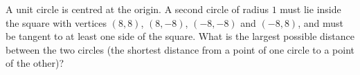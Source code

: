 A unit circle is centred at the origin. A second circle of radius $1$ must lie inside the square with vertices $(8,8)$, $(8,-8)$, $(-8,-8)$ and $(-8,8)$, and must be tangent to at least one side of the square. What is the largest possible distance between the two circles (the shortest distance from a point of one circle to a point of the other)?

